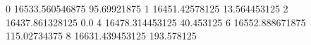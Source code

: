 0 16533.560546875 95.69921875
1 16451.42578125 13.564453125
2 16437.861328125 0.0
4 16478.314453125 40.453125
6 16552.888671875 115.02734375
8 16631.439453125 193.578125
